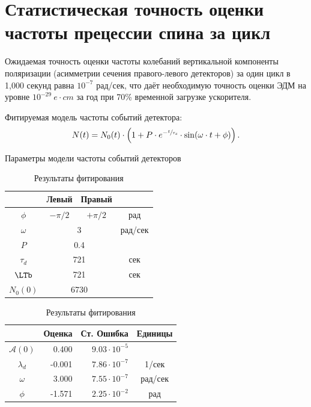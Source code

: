 \documentclass{report}
\begin{document}
\section{Статистическая точность оценки частоты прецессии спина за цикл}
\newcommand{\lamd}{\lambda_d}
\newcommand{\vp}[2]{{#1}\cdot 10^{#2}}
\newcommand{\LTd}{\tau_d}
\newcommand{\Asym}{\mathcal{A}}
Ожидаемая точность оценки частоты колебаний вертикальной компоненты поляризации (асимметрии сечения правого-левого детекторов) за один цикл в 1,000 секунд равна $10^{-7}$ рад/сек, что даёт необходимую точность оценки ЭДМ на уровне $10^{-29}~e\cdot cm$ за год при 70\% временной загрузке ускорителя.

Фитируемая модель частоты событий детектора:
\[
N(t) = N_0(t)\cdot\bkt{1 + P\cdot e^{-\sfrac{t}{\LTd}}\cdot\sin(\omega\cdot t + \phi)}.
\]

\begin{table}[h]
  \begin{minipage}[t]{.5\linewidth}
    \centering
    \caption{Параметры модели частоты событий детекторов\label{tbl:DetCntRtParam}}
    \begin{tabular}[t]{cccc}
      \hline
      &   Левый   &     Правый     &  \\ \hline
      $\phi$  & $-\pi/2$ &   $+\pi/2$    &   рад   \\
      $\omega$ &  \multicolumn{2}{c}{3}   & рад/сек \\
      $P$    & \multicolumn{2}{c}{0.4}  &  \\
      $\LTd$  & \multicolumn{2}{c}{721}  &   сек   \\
      $\LTb$  & \multicolumn{2}{c}{721}  &   сек   \\
      $N_0(0)$ & \multicolumn{2}{c}{6730} &  \\ \hline
    \end{tabular}
  \end{minipage}%
  \begin{minipage}[t]{.5\linewidth}
    \centering
    \caption{Результаты фитирования\label{tbl:FitRes}}
    \begin{tabular}[t]{crrc}
      \hline
      & Оценка &             Ст. Ошибка &  Единицы   \\ \hline
      $\Asym(0)$ &   0.400 & $\vp{9.03}{-5}$ &         \\
      $\lamd$   &  -0.001 & $\vp{7.86}{-7}$ &  1/сек  \\
      $\omega$  &   3.000 & $\vp{7.55}{-7}$ & рад/сек \\
      $\phi$   &  -1.571 & $\vp{2.25}{-2}$ &   рад   \\ \hline
    \end{tabular}
  \end{minipage}
\end{table}
\end{document}
